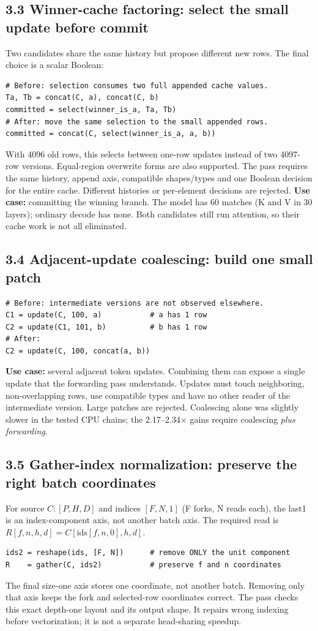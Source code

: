 \documentclass[10pt,a4paper]{article}
\begin{document}
\subsection*{3.3 Winner-cache factoring: select the small update before commit}
Two candidates share the same history but propose different new rows. The final choice is a scalar Boolean:
\begin{lstlisting}
# Before: selection consumes two full appended cache values.
Ta, Tb = concat(C, a), concat(C, b)
committed = select(winner_is_a, Ta, Tb)
# After: move the same selection to the small appended rows.
committed = concat(C, select(winner_is_a, a, b))
\end{lstlisting}
With 4096 old rows, this selects between one-row updates instead of two 4097-row versions. Equal-region overwrite forms are also supported. The pass requires the same history, append axis, compatible shapes/types and one Boolean decision for the entire cache. Different histories or per-element decisions are rejected. \textbf{Use case:} committing the winning branch. The model has 60 matches (K and V in 30 layers); ordinary decode has none. Both candidates still run attention, so their cache work is not all eliminated.

\subsection*{3.4 Adjacent-update coalescing: build one small patch}
\begin{lstlisting}
# Before: intermediate versions are not observed elsewhere.
C1 = update(C, 100, a)           # a has 1 row
C2 = update(C1, 101, b)          # b has 1 row
# After:
C2 = update(C, 100, concat(a, b))
\end{lstlisting}
\textbf{Use case:} several adjacent token updates. Combining them can expose a single update that the forwarding pass understands. Updates must touch neighboring, non-overlapping rows, use compatible types and have no other reader of the intermediate version. Large patches are rejected. Coalescing alone was slightly slower in the tested CPU chains; the 2.17--2.34$\times$ gains require coalescing \emph{plus forwarding}.

\subsection*{3.5 Gather-index normalization: preserve the right batch coordinates}
For source $C:[P,H,D]$ and indices $[F,N,1]$ (F forks, N reads each), the last1 is an index-component axis, not another batch axis. The required read is $R[f,n,h,d]=C[\mathrm{ids}[f,n,0],h,d]$.
\begin{lstlisting}
ids2 = reshape(ids, [F, N])      # remove ONLY the unit component
R    = gather(C, ids2)           # preserve f and n coordinates
\end{lstlisting}
The final size-one axis stores one coordinate, not another batch. Removing only that axis keeps the fork and selected-row coordinates correct. The pass checks this exact depth-one layout and its output shape. It repairs wrong indexing before vectorization; it is not a separate head-sharing speedup.
\end{document}
